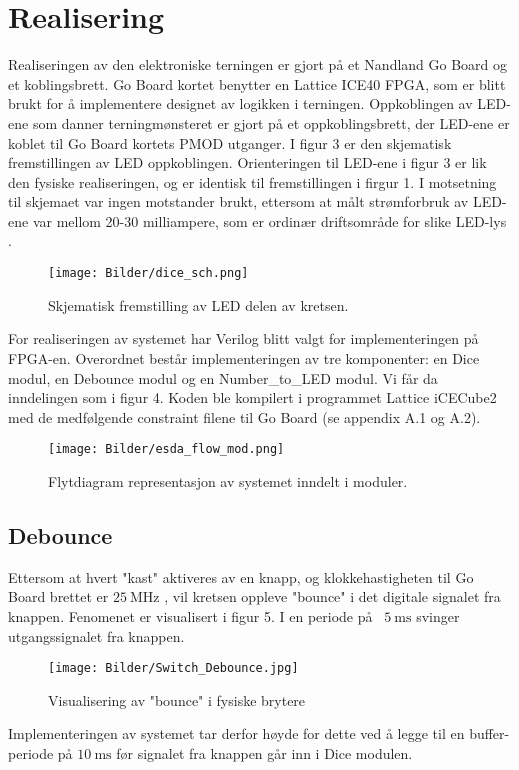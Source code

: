 \section{Realisering}
\label{realiseringOgTest}

Realiseringen av den elektroniske terningen er gjort på et Nandland Go Board \cite{goboard} 
og et koblingsbrett. Go Board kortet benytter en Lattice ICE40 FPGA, som er 
blitt brukt for å implementere designet av logikken i terningen. Oppkoblingen av 
LED-ene som danner terningmønsteret er gjort på et oppkoblingsbrett, der LED-ene 
er koblet til Go Board kortets PMOD utganger. I figur 3 er den skjematisk fremstillingen 
av LED oppkoblingen. Orienteringen til LED-ene i figur 3 er lik den fysiske 
realiseringen, og er identisk til fremstillingen i firgur 1. I motsetning til skjemaet var ingen motstander brukt,
ettersom at målt strømforbruk av LED-ene var mellom 20-30 milliampere, som er ordinær driftsområde for slike LED-lys \cite{ledcurrent}.

\begin{figure}[H]
    \centering
    \texttt{[image: Bilder/dice\_sch.png]}
    \caption{Skjematisk fremstilling av LED delen av kretsen.}    
\end{figure}


For realiseringen av systemet har Verilog blitt valgt for implementeringen på FPGA-en. Overordnet består implementeringen av tre komponenter:
en Dice modul, en Debounce modul og en Number\_to\_LED modul. Vi får da inndelingen som i figur 4.
Koden ble kompilert i programmet Lattice iCECube2 med de medfølgende constraint 
filene til Go Board (se appendix A.1 og A.2).
\begin{figure}[H]
    \centering
    \texttt{[image: Bilder/esda\_flow\_mod.png]}
    \caption{Flytdiagram representasjon av systemet inndelt i moduler.}
\end{figure}


\subsection{Debounce}
Ettersom at hvert "kast" aktiveres av en knapp, og klokkehastigheten til Go Board brettet er $\SI{25}{\mega\hertz}$ \cite{goboard}, vil 
kretsen oppleve "bounce" i det digitale signalet fra knappen. Fenomenet er visualisert i figur 5. I en periode 
på ~$\SI{5}{\milli\s}$ \cite{bouncedur} svinger utgangssignalet fra knappen.
\begin{figure}[H]
    \centering
    \texttt{[image: Bilder/Switch\_Debounce.jpg]}
    \caption{Visualisering av "bounce" i fysiske brytere \cite{bounce}}
\end{figure}
Implementeringen av systemet tar derfor høyde for dette ved å legge til en buffer-periode 
på $\SI{10}{\milli\s}$ før signalet fra knappen går inn i Dice modulen.

